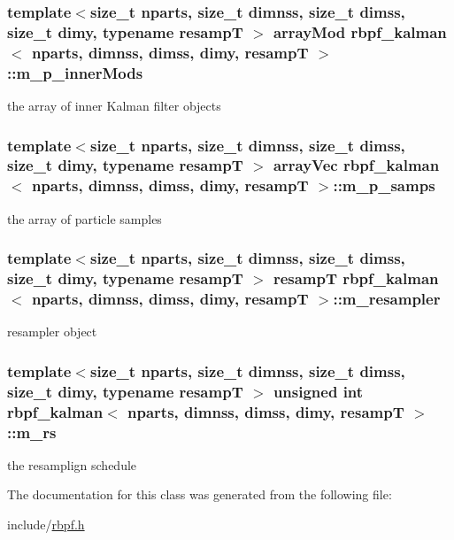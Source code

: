 \subsubsection[{\texorpdfstring{m\+\_\+p\+\_\+inner\+Mods}{m_p_innerMods}}]{\setlength{\rightskip}{0pt plus 5cm}template$<$size\+\_\+t nparts, size\+\_\+t dimnss, size\+\_\+t dimss, size\+\_\+t dimy, typename resampT $>$ {\bf array\+Mod} {\bf rbpf\+\_\+kalman}$<$ nparts, dimnss, dimss, dimy, resampT $>$\+::m\+\_\+p\+\_\+inner\+Mods\hspace{0.3cm}{\ttfamily [private]}}\hypertarget{classrbpf__kalman_a1aa8b0b72b574a913c6474f4eca6047e}{}\label{classrbpf__kalman_a1aa8b0b72b574a913c6474f4eca6047e}
the array of inner Kalman filter objects 
\subsubsection[{\texorpdfstring{m\+\_\+p\+\_\+samps}{m_p_samps}}]{\setlength{\rightskip}{0pt plus 5cm}template$<$size\+\_\+t nparts, size\+\_\+t dimnss, size\+\_\+t dimss, size\+\_\+t dimy, typename resampT $>$ {\bf array\+Vec} {\bf rbpf\+\_\+kalman}$<$ nparts, dimnss, dimss, dimy, resampT $>$\+::m\+\_\+p\+\_\+samps\hspace{0.3cm}{\ttfamily [private]}}\hypertarget{classrbpf__kalman_a0987b2423385e96309914032a976897a}{}\label{classrbpf__kalman_a0987b2423385e96309914032a976897a}
the array of particle samples 
\subsubsection[{\texorpdfstring{m\+\_\+resampler}{m_resampler}}]{\setlength{\rightskip}{0pt plus 5cm}template$<$size\+\_\+t nparts, size\+\_\+t dimnss, size\+\_\+t dimss, size\+\_\+t dimy, typename resampT $>$ resampT {\bf rbpf\+\_\+kalman}$<$ nparts, dimnss, dimss, dimy, resampT $>$\+::m\+\_\+resampler\hspace{0.3cm}{\ttfamily [private]}}\hypertarget{classrbpf__kalman_a5fdc4be3bc5018f52708d57c90e4c921}{}\label{classrbpf__kalman_a5fdc4be3bc5018f52708d57c90e4c921}
resampler object 
\subsubsection[{\texorpdfstring{m\+\_\+rs}{m_rs}}]{\setlength{\rightskip}{0pt plus 5cm}template$<$size\+\_\+t nparts, size\+\_\+t dimnss, size\+\_\+t dimss, size\+\_\+t dimy, typename resampT $>$ unsigned int {\bf rbpf\+\_\+kalman}$<$ nparts, dimnss, dimss, dimy, resampT $>$\+::m\+\_\+rs\hspace{0.3cm}{\ttfamily [private]}}\hypertarget{classrbpf__kalman_af17d1220365ce1e7c12e47d8410c7121}{}\label{classrbpf__kalman_af17d1220365ce1e7c12e47d8410c7121}
the resamplign schedule 

The documentation for this class was generated from the following file\+:\begin{DoxyCompactItemize}
\item 
include/\hyperlink{rbpf_8h}{rbpf.\+h}\end{DoxyCompactItemize}
